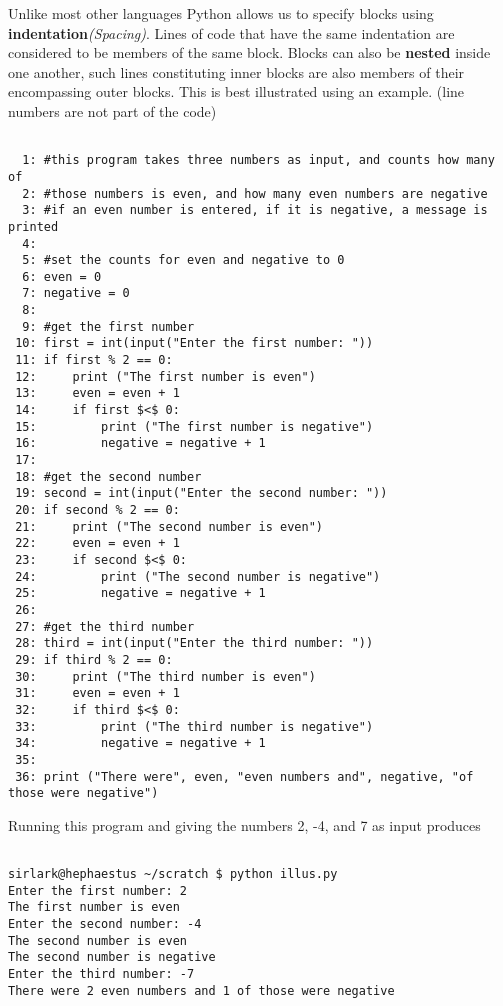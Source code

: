 Unlike most other languages Python allows us to specify blocks using   \textbf{indentation}\textit{(Spacing)}. Lines of code that have the same   indentation are considered to be members of the same block. Blocks can   also be \textbf{nested} inside one another, such lines   constituting inner blocks are also members of their encompassing outer   blocks. This is best illustrated using an example. (line numbers are   not part of the code)
\begin{lstlisting}

  1: #this program takes three numbers as input, and counts how many of
  2: #those numbers is even, and how many even numbers are negative
  3: #if an even number is entered, if it is negative, a message is printed
  4: 
  5: #set the counts for even and negative to 0
  6: even = 0
  7: negative = 0
  8: 
  9: #get the first number
 10: first = int(input("Enter the first number: "))
 11: if first % 2 == 0:
 12:     print ("The first number is even")
 13:     even = even + 1
 14:     if first $<$ 0:
 15:         print ("The first number is negative")
 16:         negative = negative + 1
 17: 
 18: #get the second number
 19: second = int(input("Enter the second number: "))
 20: if second % 2 == 0:
 21:     print ("The second number is even")
 22:     even = even + 1
 23:     if second $<$ 0:
 24:         print ("The second number is negative")
 25:         negative = negative + 1
 26: 
 27: #get the third number
 28: third = int(input("Enter the third number: "))
 29: if third % 2 == 0:
 30:     print ("The third number is even")
 31:     even = even + 1
 32:     if third $<$ 0:
 33:         print ("The third number is negative")
 34:         negative = negative + 1
 35: 
 36: print ("There were", even, "even numbers and", negative, "of those were negative")
\end{lstlisting}

Running this program and giving the numbers 2, -4, and 7 as input   produces
\begin{lstlisting}

sirlark@hephaestus ~/scratch $ python illus.py 
Enter the first number: 2
The first number is even
Enter the second number: -4
The second number is even
The second number is negative
Enter the third number: -7
There were 2 even numbers and 1 of those were negative
\end{lstlisting}

